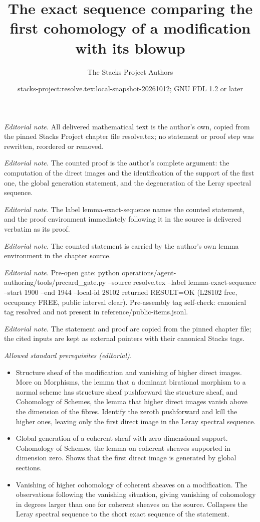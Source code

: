 \documentclass[10pt,a4paper]{amsart}
\title{The exact sequence comparing the first cohomology of a modification with its blowup}
\author{The Stacks Project Authors}
\date{stacks-project:resolve.tex:local-snapshot-20261012; GNU FDL 1.2 or later}
\theoremstyle{plain}
\theoremstyle{definition}
\theoremstyle{remark}
\numberwithin{equation}{subsection}
\begin{document}
\maketitle
\noindent\textit{Editorial note.} All delivered mathematical text is the author's own, copied from the pinned Stacks Project chapter file resolve.tex; no statement or proof step was rewritten, reordered or removed.\par\medskip
\noindent\textit{Editorial note.} The counted proof is the author's complete argument: the computation of the direct images and the identification of the support of the first one, the global generation statement, and the degeneration of the Leray spectral sequence.\par\medskip
\noindent\textit{Editorial note.} The label lemma-exact-sequence names the counted statement, and the proof environment immediately following it in the source is delivered verbatim as its proof.\par\medskip
\noindent\textit{Editorial note.} The counted statement is carried by the author's own lemma environment in the chapter source.\par\medskip
\noindent\textit{Editorial note.} Pre-open gate: python operations/agent-authoring/tools/precard\_gate.py --source resolve.tex --label lemma-exact-sequence --start 1900 --end 1944 --local-id 28102 returned RESULT=OK (L28102 free, occupancy FREE, public interval clear). Pre-assembly tag self-check: canonical tag resolved and not present in reference/public-items.jsonl.\par\medskip
\noindent\textit{Editorial note.} The statement and proof are copied from the pinned chapter file; the cited inputs are kept as external pointers with their canonical Stacks tags.\par\medskip
\noindent\textit{Allowed standard prerequisites (editorial).}\begin{itemize}
\item Structure sheaf of the modification and vanishing of higher direct images. More on Morphisms, the lemma that a dominant birational morphism to a normal scheme has structure sheaf pushforward the structure sheaf, and Cohomology of Schemes, the lemma that higher direct images vanish above the dimension of the fibres. Identify the zeroth pushforward and kill the higher ones, leaving only the first direct image in the Leray spectral sequence.
\item Global generation of a coherent sheaf with zero dimensional support. Cohomology of Schemes, the lemma on coherent sheaves supported in dimension zero. Shows that the first direct image is generated by global sections.
\item Vanishing of higher cohomology of coherent sheaves on a modification. The observations following the vanishing situation, giving vanishing of cohomology in degrees larger than one for coherent sheaves on the source. Collapses the Leray spectral sequence to the short exact sequence of the statement.
\end{itemize}\medskip
\end{document}

